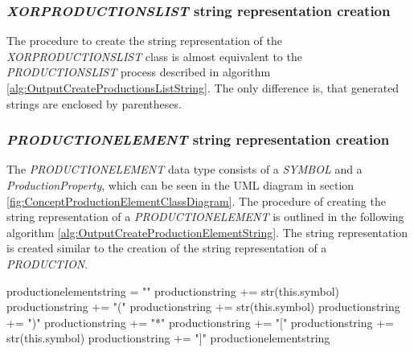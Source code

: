 \subsubsection{\textit{XOR\textunderscore PRODUCTIONS\textunderscore LIST} string representation creation}
The procedure to create the string representation of the \textit{XOR\textunderscore PRODUCTIONS\textunderscore LIST} class is almost equivalent to the \textit{PRODUCTIONS\textunderscore LIST} process described in algorithm \ref{alg:OutputCreateProductionsListString}. The only difference is, that generated strings are enclosed by parentheses.
\subsubsection{\textit{PRODUCTION\textunderscore ELEMENT} string representation creation}

The \textit{PRODUCTION\textunderscore ELEMENT} data type consists of a \textit{SYMBOL} and a \textit{ProductionProperty}, which can be seen in the UML diagram in section \ref{fig:ConceptProductionElementClassDiagram}.
The procedure of creating the string representation of a \textit{PRODUCTION\textunderscore ELEMENT} is outlined in the following algorithm \ref{alg:OutputCreateProductionElementString}. The string representation is created similar to the creation of the string representation of a \textit{PRODUCTION}.

\begin{algorithm}[H]
\caption{\textit{PRODUCTION\textunderscore ELEMENT}  string creation}
\label{alg:OutputCreateProductionElementString}
\begin{algorithmic}[1]
\State production\textunderscore element\textunderscore string = ""
		\State production\textunderscore string += str(this.symbol)
		\State production\textunderscore string += "("
		\State production\textunderscore string += str(this.symbol)
		\State production\textunderscore string += ")"
		\State production\textunderscore string += "*"
		\State production\textunderscore string += "["
		\State production\textunderscore string += str(this.symbol)
		\State production\textunderscore string += "]"
	\EndIf
\State production\textunderscore element\textunderscore string
\end{algorithmic}
\end{algorithm}

